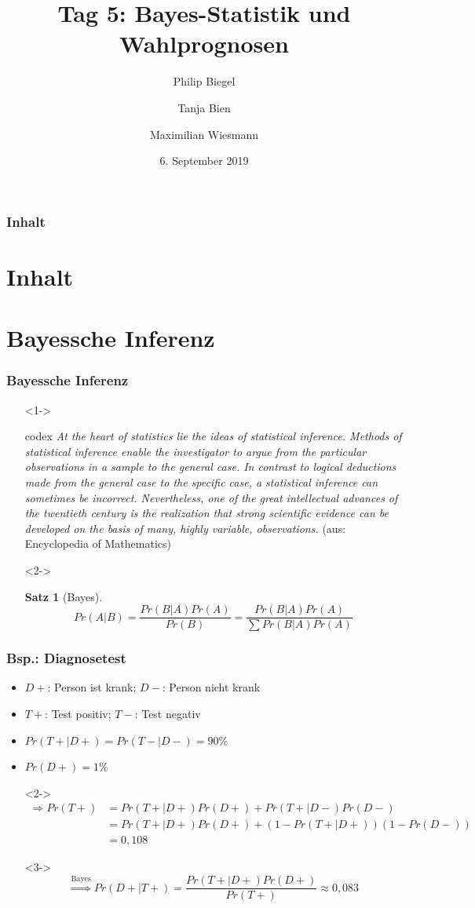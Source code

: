 \documentclass[aspectratio=169,xcolor=dvipsnames]{beamer}
\title[Bayes-Statistik \& Wahlprognosen]{\textbf{Tag 5: Bayes-Statistik und Wahlprognosen}}
\author[Philip \and Tanja \and Maximilian]{Philip Biegel \and Tanja Bien \and Maximilian Wiesmann}
\institute[]{Sommerakademie der Studienstiftung Olang - Arbeitsgruppe 4: Empirische Wahlforschung und Wahlprognosen}
\date{6. September 2019}
\newtheorem{satz}{Satz}
\begin{document}
\begin{frame}
\titlepage
\end{frame}

\begin{frame}
\frametitle{Inhalt}
\section[Inhalt]{Inhalt}
\tableofcontents
\end{frame}

\section{Bayessche Inferenz}
\begin{frame}
\frametitle{Bayessche Inferenz}
\begin{itemize}
	\item[]<1-> 
	\begin{beamercolorbox}[sep=0.5em,wd=\textwidth,shadow=true,rounded=true]{codex}
		\textit{\glqq At the heart of statistics lie the ideas of statistical inference. Methods of statistical inference enable the investigator to argue from the particular observations in a sample to the general case. In contrast to logical deductions made from the general case to the specific case, a statistical inference can sometimes be incorrect. Nevertheless, one of the great intellectual advances of the twentieth century is the realization that strong scientific evidence can be developed on the basis of many, highly variable, observations.\grqq} (aus: Encyclopedia of Mathematics)
	\end{beamercolorbox}
	\item[]<2->
	\begin{satz}[Bayes]
		$$Pr(A|B) = \frac{Pr(B|A)Pr(A)}{Pr(B)} = \frac{Pr(B|A)Pr(A)}{\sum Pr(B|A)Pr(A)}$$
	\end{satz}
\end{itemize}
\end{frame}

\begin{frame}
\frametitle{Bsp.: Diagnosetest}
\begin{itemize}
	\item<1-> $D+$: Person ist krank; $D-$: Person nicht krank
	\item<1-> $T+$: Test positiv; $T-$: Test negativ
	\item<1-> $Pr(T+|D+)=Pr(T-|D-)=90\%$
	\item<1-> $Pr(D+)=1\%$
	\item[]<2-> \begin{align*}
				\Rightarrow Pr(T+) & = Pr(T+|D+)Pr(D+) + Pr(T+|D-)Pr(D-)\\ & = Pr(T+|D+)Pr(D+) + (1-Pr(T+|D+))(1-Pr(D-))\\ & = 0,108
			\end{align*}
	\item[]<3-> $$\overset{\text{Bayes}}{\Rightarrow} Pr(D+|T+) = \frac{Pr(T+|D+)Pr(D+)}{Pr(T+)}\approx 0,083$$
\end{itemize}
\end{frame}
\end{document}
